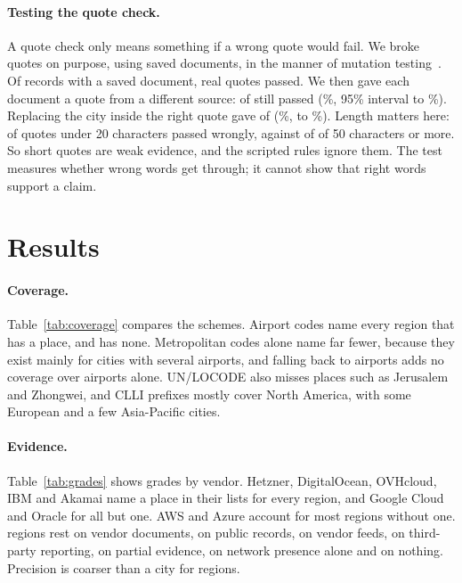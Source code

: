 \documentclass[10pt,twocolumn]{article}
\begin{document}
\paragraph{Testing the quote check.} A quote check only means something if a wrong quote would fail. We broke quotes on purpose, using saved documents, in the manner of mutation testing~\citep{demillo1978hints,jia2011analysis}. Of \mutationControlTotal{} records with a saved document, \mutationControl{} real quotes passed. We then gave each document a quote from a different source: \mutationQuoteFalse{} of \mutationQuoteRecords{} still passed (\mutationQuoteShare{}\%, 95\% interval \mutationQuoteLow{} to \mutationQuoteHigh{}\%). Replacing the city inside the right quote gave \mutationCityFalse{} of \mutationCityRecords{} (\mutationCityShare{}\%, \mutationCityLow{} to \mutationCityHigh{}\%). Length matters here: \mutationShortFalse{} of \mutationShortRecords{} quotes under 20 characters passed wrongly, against \mutationLongFalse{} of \mutationLongRecords{} of 50 characters or more. So short quotes are weak evidence, and the scripted rules ignore them. The test measures whether wrong words get through; it cannot show that right words support a claim.

\section{Results}
\label{sec:results}

\paragraph{Coverage.} Table~\ref{tab:coverage} compares the schemes. Airport codes name every region that has a place, and \placedNone{} has none. Metropolitan codes alone name far fewer, because they exist mainly for cities with several airports, and falling back to airports adds no coverage over airports alone. UN/LOCODE also misses places such as Jerusalem and Zhongwei, and CLLI prefixes mostly cover North America, with some European and a few Asia-Pacific cities.

\begin{table}[tp]
\centering
\small

\caption{How many of the \regionCount{} regions each scheme can name. Coverage depends on the derived places, including low-confidence ones.}
\label{tab:coverage}
\end{table}

\paragraph{Evidence.} Table~\ref{tab:grades} shows grades by vendor. Hetzner, DigitalOcean, OVHcloud, IBM and Akamai name a place in their lists for every region, and Google Cloud and Oracle for all but one. AWS and Azure account for most regions without one. \gradeVendorDocument{} regions rest on vendor documents, \gradePublicRecord{} on public records, \feedRegions{} on vendor feeds, \gradeReported{} on third-party reporting, \gradePartial{} on partial evidence, \gradeNetwork{} on network presence alone and \gradeAssumed{} on nothing. Precision is coarser than a city for \precisionCoarse{} regions.
\end{document}
